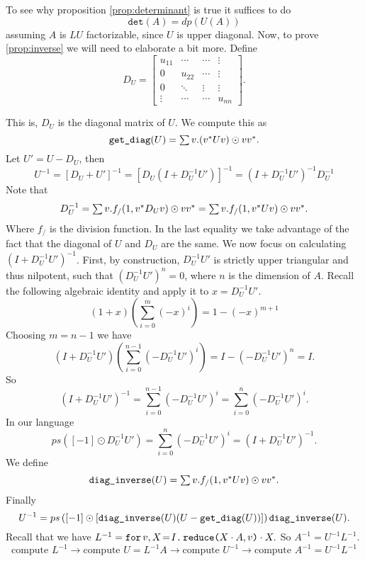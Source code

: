 To see why proposition \ref{prop:determinant} is true it suffices to do $$\texttt{det}(A)=dp(U(A))$$ assuming $A$ is $LU$ factorizable, since $U$ is upper diagonal.
Now, to prove \ref{prop:inverse} we will need to elaborate a bit more. Define 
\[
D_U = \begin{bmatrix}
    u_{11} & \cdots & \cdots &  \vdots \\
    0 & u_{22} & \cdots &  \vdots \\
    0 & \ddots & \vdots & \vdots \\
    \vdots & \cdots& \cdots & u_{nn}
\end{bmatrix}.
\]

This is, $D_U$ is the diagonal matrix of $U$. We compute this as $$ \getdiag{U} = \ssum v. (v^*Uv) \odot vv^*.$$
Let $U'=U-D_U$, then $$ U^{-1}=\left[ D_U+U' \right]^{-1}= \left[ D_U\left( I+D_U^{-1}U'\right) \right]^{-1} = \left( I+D_U^{-1}U'\right)^{-1}D_U^{-1} $$
Note that $$D_U^{-1}=\ssum v. f_{/}(1,v^*D_Uv)\odot vv^*=\ssum v. f_{/}(1,v^*Uv)\odot vv^*.$$
Where $f_{/}$ is the division function. In the last equality we take advantage of the fact that the diagonal of $U$ and $D_U$ are the same.
We now focus on calculating $\left( I+D_U^{-1}U'\right)^{-1}$. First, by construction, $D_U^{-1}U'$ is strictly upper triangular and thus nilpotent, such that $\left( D_U^{-1}U'\right)^n=0$, where $n$ is the dimension of $A$. Recall the following algebraic identity and apply it to $x=D_U^{-1}U'$. $$(1+x)\left( \sum_{i=0}^{m}(-x)^i \right)=1-(-x)^{m+1}$$
Choosing $m=n-1$ we have $$\left(I+D_U^{-1}U' \right)\left( \sum_{i=0}^{n-1}(-D_U^{-1}U')^i \right)=I- \left( -D_U^{-1}U'\right)^n =I. $$
So $$\left(I+D_U^{-1}U' \right)^{-1}=\sum_{i=0}^{n-1}(-D_U^{-1}U')^i=\sum_{i=0}^{n}(-D_U^{-1}U')^i.$$
In our language $$ps([-1]\odot D_U^{-1}U')=\sum_{i=0}^{n}(-D_U^{-1}U')^i=\left(I+D_U^{-1}U' \right)^{-1}.$$
We define $$\diaginverse{U}=\ssum v. f_{/}(1,v^*Uv)\odot vv^*.$$
Finally $$U^{-1}= ps\left([-1]\odot \left[\diaginverse{U}(U-\getdiag{U})\right] \right)\diaginverse{U}.$$
Recall that we have $L^{-1}=\initf{I}{v}{X}{\red{X\cdot A}{v}\cdot X}.$ So $A^{-1}=U^{-1}L^{-1}.$
$$\text{compute }L^{-1}\rightarrow\text{compute }U=L^{-1}A\rightarrow\text{compute }U^{-1}\rightarrow\text{compute }A^{-1}=U^{-1}L^{-1}$$